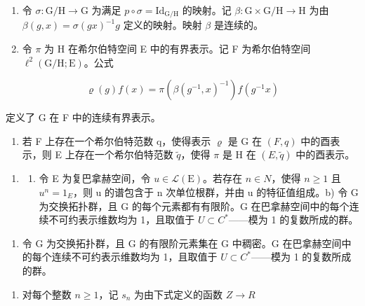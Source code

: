 \begin{enumerate}
\def\labelenumi{\alph{enumi})}
\item
  令 \(\sigma\colon\mathrm{G/H}\to\mathrm{G}\) 为满足 \(p\circ\sigma=\mathrm{Id}_{\mathrm{G/H}}\) 的映射。记 \(\beta\colon\mathrm{G}\times\mathrm{G/H}\to\mathrm{H}\) 为由 \(\beta(g,x)=\sigma(gx)^{-1}g\) 定义的映射。映射 \(\beta\) 是连续的。
\item
  令 \(\pi\) 为 H 在希尔伯特空间 E 中的有界表示。记 F 为希尔伯特空间 \(\ell^2 (\mathrm{G / H};\mathrm{E})\)。公式
\end{enumerate}

\[
\varrho (g) f (x) = \pi (\beta (g ^ {- 1}, x) ^ {- 1}) f (g ^ {- 1} x)
\]

定义了 G 在 F 中的连续有界表示。

\begin{enumerate}
\def\labelenumi{\alph{enumi})}
\setcounter{enumi}{2}
\tightlist
\item
  若 F 上存在一个希尔伯特范数 q，使得表示 \(\varrho\) 是 G 在 \((F,q)\) 中的酉表示，则 E 上存在一个希尔伯特范数 \(\widetilde{q}\)，使得 \(\pi\) 是 H 在 \((E,\widetilde{q})\) 中的酉表示。
\end{enumerate}

\begin{enumerate}
\def\labelenumi{\arabic{enumi})}
\setcounter{enumi}{5}
\tightlist
\item
  \begin{enumerate}
  \def\labelenumii{\alph{enumii})}
  \tightlist
  \item
    令 E 为复巴拿赫空间，令 \(u \in \mathcal{L}(\mathrm{E})\)。若存在 \(n \in N\)，使得 \(n \geqslant 1\) 且 \(u^{n} = 1_{E}\)，则 u 的谱包含于 n 次单位根群，并由 u 的特征值组成。b) 令 G 为交换拓扑群，且 G 的每个元素都有有限阶。G 在巴拿赫空间中的每个连续不可约表示维数均为 1，且取值于 \(U \subset C^{*}\)——模为 1 的复数所成的群。
  \end{enumerate}
\end{enumerate}

\begin{enumerate}
\def\labelenumi{\alph{enumi})}
\setcounter{enumi}{2}
\tightlist
\item
  令 G 为交换拓扑群，且 G 的有限阶元素集在 G 中稠密。G 在巴拿赫空间中的每个连续不可约表示维数均为 1，且取值于 \(U \subset C^{*}\)——模为 1 的复数所成的群。
\end{enumerate}

\begin{enumerate}
\def\labelenumi{\arabic{enumi})}
\setcounter{enumi}{6}
\tightlist
\item
  对每个整数 \(n \geqslant 1\)，记 \(s_{n}\) 为由下式定义的函数 \(Z \rightarrow R\)
\end{enumerate}

